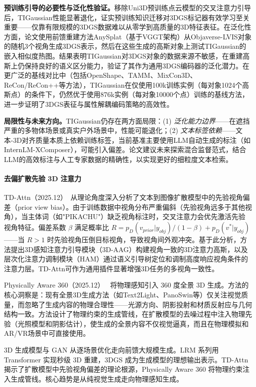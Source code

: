 \textbf{预训练引导的必要性与泛化性验证。}移除Uni3D预训练点云模型的交叉注意力引导后，TIGaussian性能显著退化，证实预训练知识迁移对3DGS标记器有效学习至关重要——仅靠有限规模的3DGS数据难以从零学到高质量的3D特征表征。在泛化性方面，论文使用前馈重建方法AnySplat（基于VGGT架构）从Objaverse-LVIS对象的随机3个视角生成3DGS表示，然后在这些生成的高斯对象上测试TIGaussian的嵌入相似度热图。结果表明TIGaussian对3DGS对象的数据来源不敏感，在重建高斯上仍保持良好的语义区分能力，验证了其作为通用3DGS编码器的泛化潜力。在更广泛的基线对比中（包括OpenShape、TAMM、MixCon3D、ReCon/ReCon++等方法），TIGaussian在仅使用100k训练实例（每对象1024个高斯点）的条件下，仍然优于使用876k实例（每对象10000个点）训练的基线方法，进一步证明了3DGS表征与属性解耦编码策略的高效性。

\textbf{局限性与未来方向。}TIGaussian仍存在两方面局限：(1) \emph{泛化能力边界}——在遮挡严重的多物体场景或真实户外场景中，性能可能退化；(2) \emph{文本标签依赖}——文本-3D对齐质量本质上依赖训练标签，当前基准主要使用LLM自动生成的标注（如InternLM-XComposer），可能引入偏差。论文建议未来探索混合监督范式，结合LLM的高效标注与人工专家数据的精确性，以实现更好的细粒度文本检索。

\paragraph{去偏扩散先验 3D 注意力}

TD-Attn（2025.12）~\cite{2512_07345}从理论角度深入分析了文本到图像扩散模型中的先验视角偏差（prior view bias）。由于训练数据中视角分布严重偏斜（先验视角远多于其他视角），当主体词（如"PIKACHU"）缺乏视角标注时，交叉注意力会优先激活先验视角特征。偏差系数 $\beta$ 满足概率比 $R = p_D(v_{prior}|y_{obj})/(1-\beta) + p_D(v^*|y_{obj})$——当 $R > 1$ 时先验视角压倒目标视角，导致视角间外观冲突。基于此分析，方法提出3D感知注意力引导模块（3D-AAG）构建视角一致的3D注意力高斯，以及层次化注意力调制模块（HAM）通过语义引导树定位和调制高度响应视角条件的注意力层。TD-Attn可作为通用插件显著增强3D任务的多视角一致性。

Physically Aware 360（2025.12）~\cite{2512_10293} 将物理感知引入 360 度全景 3D 生成。方法的核心洞察是：现有全景3D生成方法（如Text2Light、PanoSwin等）仅关注视觉质量，而忽略了生成内容的物理合理性——光源方向、阴影投射和材质反射应与几何结构一致。方法设计了物理约束的生成管线，在扩散模型的去噪过程中注入物理先验（光照模型和阴影估计），使生成的全景内容不仅视觉逼真，而且在物理模拟和AR/VR场景中可直接使用。

\begin{takeaway}
3D 生成模型与 GAN 从逐场景优化走向前馈大规模生成。LRM 系列用 Transformer 实现秒级 3D 重建，3DGS 成为生成模型的理想输出表示。TD-Attn 揭示了扩散模型中先验视角偏差的理论根源，Physically Aware 360 将物理约束注入生成管线。核心趋势是从纯视觉生成走向物理感知生成。
\end{takeaway}

